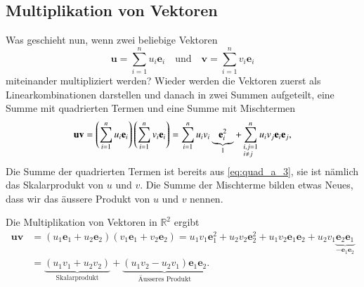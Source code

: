 \subsection{Multiplikation von Vektoren}
Was geschieht nun, wenn zwei beliebige Vektoren
\begin{equation}
    \textbf{u} = 
    \sum_{i=1}^{n} u_i \textbf{e}_i 
    \quad
    \text{und}
    \quad
    \textbf{v} = \sum_{i=1}^{n} v_i \textbf{e}_i
\end{equation}
 miteinander multipliziert werden? 
 Wieder werden die Vektoren zuerst als Linearkombinationen darstellen und danach in zwei Summen aufgeteilt, eine Summe mit quadrierten Termen und eine Summe mit Mischtermen
\begin{equation}
    \begin{split}
        \textbf{u}\textbf{v} 
        =
        \left ( 
        \sum_{i=1}^{n} u_i \textbf{e}_i
        \right ) 
        \left ( 
        \sum_{i=1}^{n} v_i \textbf{e}_i
        \right) 
        = 
        \sum_{i=1}^n u_iv_i\underbrace{\textbf{e}_i^2}_{1} 
        + \sum_{\begin{subarray}{l}i,j=1\\i \neq j\end{subarray}}^n  u_iv_j\textbf{e}_i\textbf{e}_j,
    \end{split}
\end{equation}
Die Summe der quadrierten Termen ist bereits aus \eqref{eq:quad_a_3}, sie ist nämlich das Skalarprodukt von $u$ und $v$. Die Summe der Mischterme bilden etwas Neues, dass wir das äussere Produkt von $u$ und $v$ nennen.
\begin{beispiel}
    Die Multiplikation von Vektoren in $\mathbb{R}^2$ ergibt
\begin{equation}
    \begin{split}
        \textbf{u}\textbf{v} 
        &= 
        (u_1\textbf{e}_1 + u_2\textbf{e}_2)(v_1\textbf{e}_1 + v_2\textbf{e}_2) 
        = 
        u_1v_1\textbf{e}_1^2
        + 
        u_2v_2\textbf{e}_2^2 
        + 
        u_1v_2\textbf{e}_1\textbf{e}_2 
        +  
        u_2v_1\underbrace{\textbf{e}_2\textbf{e}_1}_{-\textbf{e}_1\textbf{e}_2}
        \\\ 
        &=  
        \underbrace{(u_1v_1 + u_2v_2)}_{\text{Skalarprodukt}} 
        + 
        \underbrace{(u_1v_2 - u_2v_1)\textbf{e}_1\textbf{e}_2}_{\text{Äusseres Produkt}}.
    \end{split}
\end{equation}
\end{beispiel}
